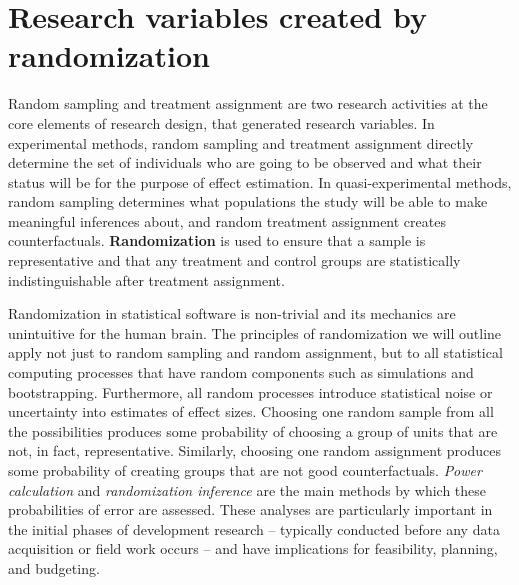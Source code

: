 \section{Research variables created by randomization}

Random sampling and treatment assignment are two research activities
at the core elements of research design,
that generated research variables.
In experimental methods,
random sampling and treatment assignment directly determine
the set of individuals who are going to be observed
and what their status will be for the purpose of effect estimation.
In quasi-experimental methods,
random sampling determines what populations the study
will be able to make meaningful inferences about,
and random treatment assignment creates counterfactuals.
\textbf{Randomization}
is used to ensure that a sample is representative and
that any treatment and control groups are statistically indistinguishable
after treatment assignment.

Randomization in statistical software is non-trivial
and its mechanics are unintuitive for the human brain.
The principles of randomization we will outline
apply not just to random sampling and random assignment,
but to all statistical computing processes that have random components
such as simulations and bootstrapping.
Furthermore, all random processes introduce statistical noise
or uncertainty into estimates of effect sizes.
Choosing one random sample from all the possibilities produces some probability of
choosing a group of units that are not, in fact, representative.
Similarly, choosing one random assignment produces some probability of
creating groups that are not good counterfactuals.
\textit{Power calculation} and \textit{randomization inference}
are the main methods by which these probabilities of error are assessed.
These analyses are particularly important in the initial phases of development research --
typically conducted before any data acquisition or field work occurs --
and have implications for feasibility, planning, and budgeting.

